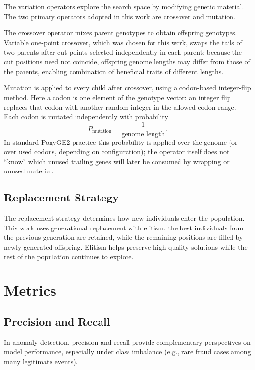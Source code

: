 The variation operators explore the search space by modifying genetic material.
The two primary operators adopted in this work are crossover and mutation.

The crossover operator mixes parent genotypes to obtain offspring genotypes.
Variable one-point crossover, which was chosen for this work, swaps the tails of two parents after cut points selected independently in each parent; because the cut positions need not coincide, offspring genome lengths may differ from those of the parents, enabling combination of beneficial traits of different lengths.

Mutation is applied to every child after crossover, using a codon-based integer-flip method.
Here a codon is one element of the genotype vector: an integer flip replaces that codon with another random integer in the allowed codon range.
Each codon is mutated independently with probability
\begin{equation}
    P_{\text{mutation}} = \frac{1}{\text{genome\_length}}.
\end{equation}
In standard PonyGE2 practice this probability is applied over the genome (or over used codons, depending on configuration); the operator itself does not ``know'' which unused trailing genes will later be consumed by wrapping or unused material.

\subsection{Replacement Strategy}

The replacement strategy determines how new individuals enter the population.
This work uses generational replacement with elitism: the best individuals from the previous generation are retained, while the remaining positions are filled by newly generated offspring.
Elitism helps preserve high-quality solutions while the rest of the population continues to explore.

\section{Metrics}

\subsection{Precision and Recall}

In anomaly detection, precision and recall provide complementary perspectives on model performance, especially under class imbalance (e.g., rare fraud cases among many legitimate events).

